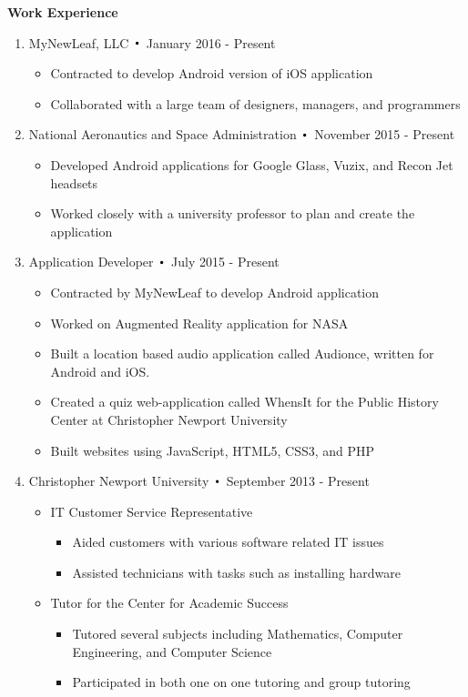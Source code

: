 \noindent\textbf{\large Work Experience}
\begin{enumerate}[label={\Roman*}.]

\item MyNewLeaf, LLC $\Bigcdot$ January 2016 - Present
\begin{itemize}
\item Contracted to develop Android version of iOS application
\item Collaborated with a large team of designers, managers, and programmers
\end{itemize}

\item National Aeronautics and Space Administration $\Bigcdot$ November 2015 - Present
\begin{itemize}
\item Developed Android applications for Google Glass, Vuzix, and Recon Jet headsets
\item Worked closely with a university professor to plan and create the application
\end{itemize}

\item Application Developer $\Bigcdot$ July 2015 - Present
\begin{itemize}
\item Contracted by MyNewLeaf to develop Android application
\item Worked on Augmented Reality application for NASA
\item Built a location based audio application called Audionce, written for Android and iOS.
\item Created a quiz web-application called WhensIt for the Public History Center at Christopher Newport
University
\item Built websites using JavaScript, HTML5, CSS3, and PHP
\end{itemize}

\item Christopher Newport University $\Bigcdot$ September 2013 - Present
\begin{itemize}
\item IT Customer Service Representative
\begin{itemize}
\item Aided customers with various software related IT issues
\item Assisted technicians with tasks such as installing hardware
\end{itemize}
\item Tutor for the Center for Academic Success
\begin{itemize}
\item Tutored several subjects including Mathematics, Computer Engineering, and Computer Science
\item Participated in both one on one tutoring and group tutoring
\end{itemize}
\end{itemize}


\end{enumerate}
